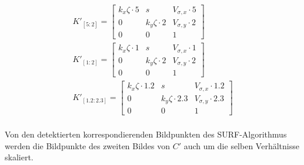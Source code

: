 \begin{gather*}
K'_{[5:2]}=	
\begin{bmatrix}
k_x\zeta \cdot 5 &s&V_{\sigma,x} \cdot 5\\
0&k_y\zeta \cdot 2&V_{\sigma,y} \cdot 2\\
0&0&1
\end{bmatrix}\\
K'_{[1:2]}=	
\begin{bmatrix}
k_x\zeta \cdot 1 &s&V_{\sigma,x} \cdot 1\\
0&k_y\zeta\cdot 2&V_{\sigma,y} \cdot 2\\
0&0&1
\end{bmatrix}\\
K'_{[1.2:2.3]}=	
\begin{bmatrix}
k_x\zeta \cdot 1.2 &s&V_{\sigma,x} \cdot 1.2\\
0&k_y\zeta \cdot 2.3&V_{\sigma,y} \cdot 2.3\\
0&0&1
\end{bmatrix}\\
\end{gather*}


Von den detektierten korrespondierenden Bildpunkten des SURF-Algorithmus werden die Bildpunkte des zweiten Bildes von $C'$ auch um die selben Verhältnisse skaliert.


